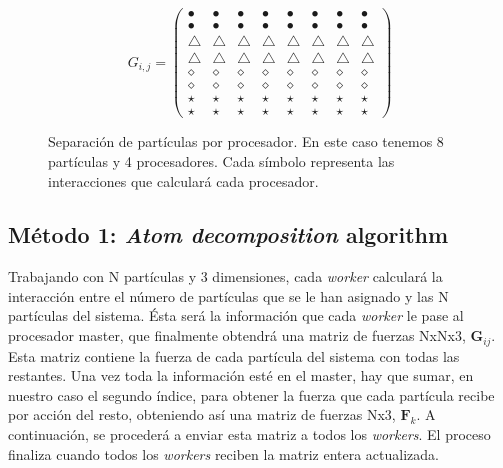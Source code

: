 \documentclass[onecolumn]{article}
\renewcommand{\vec}[1]{\mathbf{#1}}
\begin{document}
\begin{figure}[ht]
\begin{equation*}
G_{i,j}=\begin{pmatrix}
\bullet  & \bullet & \bullet &\bullet  &\bullet  & \bullet & \bullet &\bullet \\ 
 \bullet&\bullet  &  \bullet& \bullet & \bullet & \bullet & \bullet &\bullet \\
 \bigtriangleup&\bigtriangleup  &  \bigtriangleup& \bigtriangleup & \bigtriangleup & \bigtriangleup & \bigtriangleup &\bigtriangleup \\
 \bigtriangleup&\bigtriangleup  &  \bigtriangleup& \bigtriangleup & \bigtriangleup & \bigtriangleup & \bigtriangleup &\bigtriangleup \\
 \diamond & \diamond  &  \diamond&  \diamond & \diamond &  \diamond &  \diamond & \diamond \\
 \diamond & \diamond  &  \diamond&  \diamond & \diamond &  \diamond &  \diamond & \diamond \\
 \star & \star  &  \star&  \star & \star &  \star &  \star & \star \\
 \star & \star  &  \star&  \star & \star &  \star &  \star & \star
 \end{pmatrix}
\end{equation*}
\caption{Separación de partículas por procesador. En este caso tenemos 8 partículas y 4 procesadores. Cada símbolo representa las interacciones que calculará cada procesador. }
\label{interaction_mat1}
\end{figure}

\subsection{Método 1: \textit{Atom decomposition} algorithm}

Trabajando con N partículas y 3 dimensiones, cada \textit{worker} calculará la interacción entre el número de partículas que se le han asignado y las N partículas del sistema. Ésta será la información que cada \textit{worker} le pase al procesador master, que finalmente obtendrá una matriz de fuerzas NxNx3, $\vec{G}_{ij}$. Esta matriz contiene la fuerza de cada partícula del sistema con todas las restantes. Una vez toda la información esté en el master, hay que sumar, en nuestro caso el segundo índice, para obtener la fuerza que cada partícula recibe por acción del resto, obteniendo así una matriz de fuerzas Nx3, $\vec{F}_{k}$. A continuación, se procederá a enviar esta matriz a todos los \textit{workers}. El proceso finaliza cuando todos los \textit{workers} reciben la matriz entera actualizada.
\end{document}
